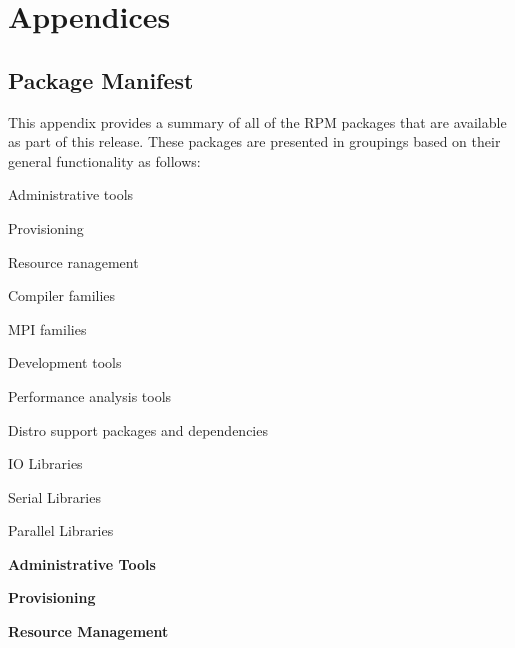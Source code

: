 \clearpage

\appendix
\section*{Appendices}
\renewcommand{\thesubsection}{\Alph{subsection}}

\subsection{Package Manifest}

This appendix provides a summary of all of the RPM packages that are available
as part of this \FSP{} release. These packages are presented in groupings
based on their general functionality as follows:

\begin{itemize*}
\item Administrative tools
\item Provisioning
\item Resource ranagement
\item Compiler families
\item MPI families
\item Development tools
\item Performance analysis tools
\item Distro support packages and dependencies
\item IO Libraries
\item Serial Libraries
\item Parallel Libraries
\end{itemize*}


\newcommand{\firstColWidth}{3.5cm}
\newcommand{\secondColWidth}{1.5cm}


\begin{table}[h!]

\caption{\bf Administrative Tools} \vspace*{0.1cm}
\end{table}

\begin{table}[h!]

\caption{\bf Provisioning} \vspace*{0.1cm}
\end{table}

\begin{table}[h!]

\caption{\bf Resource Management} \vspace*{0.1cm}
\end{table}


